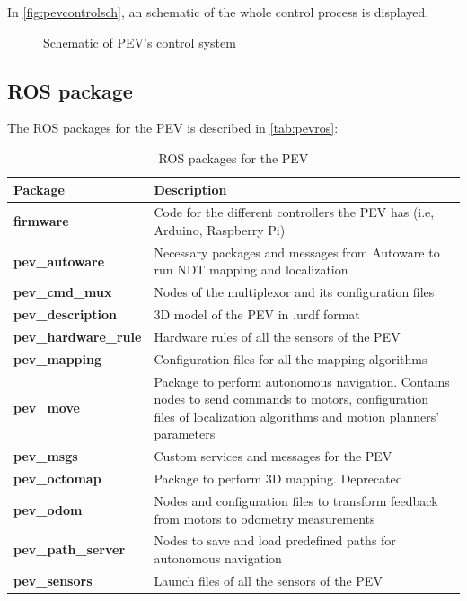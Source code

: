 In \autoref{fig:pevcontrolsch}, an schematic of the whole control process is displayed.
\begin{figure}[htb]
  \centering
  \caption{Schematic of PEV's control system}
  \label{fig:pevcontrolsch}
\end{figure}

\subsection{ROS package}

The ROS packages for the PEV is described in \autoref{tab:pevros}:
\begin{table}[h!]
  \centering
  \begin{tabular}{lp{8cm}}
    \hline
    \textbf{Package} & \textbf{Description} \\ \hline
    \textbf{firmware} & Code for the different controllers the PEV has (i.e, Arduino, Raspberry Pi) \\ \hline
    \textbf{pev\_autoware} & Necessary packages and messages from Autoware to run NDT mapping and localization \\ \hline
    \textbf{pev\_cmd\_mux} & Nodes of the multiplexor and its configuration files \\ \hline
    \textbf{pev\_description} & 3D model of the PEV in .urdf format \\ \hline
    \textbf{pev\_hardware\_rule} & Hardware rules of all the sensors of the PEV \\ \hline
    \textbf{pev\_mapping} & Configuration files for all the mapping algorithms \\ \hline
    \textbf{pev\_move} & Package to perform autonomous navigation. Contains nodes to send commands to motors, configuration files of localization algorithms and motion planners' parameters \\ \hline
    \textbf{pev\_msgs} & Custom services and messages for the PEV \\ \hline
    \textbf{pev\_octomap} & Package to perform 3D mapping. Deprecated \\ \hline
    \textbf{pev\_odom} & Nodes and configuration files to transform feedback from motors to odometry measurements \\ \hline
    \textbf{pev\_path\_server} & Nodes to save and load predefined paths for autonomous navigation \\ \hline
    \textbf{pev\_sensors} & Launch files  of all the sensors of the PEV \\ \hline
  \end{tabular}
  \caption{ROS packages for the PEV}
  \label{tab:pevros}
\end{table}

